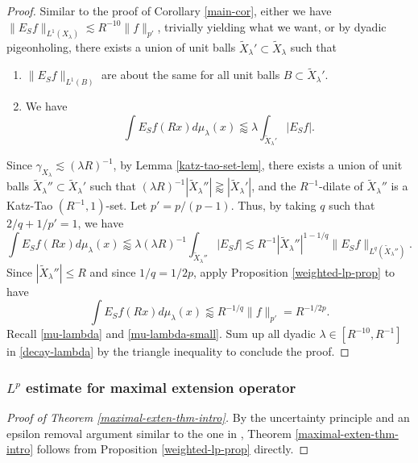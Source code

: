 \documentclass{amsart}
\numberwithin{equation}{section}
\newcommand{\ga}{\gamma}
\newcommand{\la}{\lambda}
\newcommand{\wt}{\widetilde}
\begin{document}
\begin{proof}
Similar to the proof of Corollary \ref{main-cor}, either we have $\|E_Sf\|_{L^1(X_\la)}\lesssim R^{-10}\|f\|_{p'}$, trivially yielding what we want, or by dyadic pigeonholing, there exists a union of unit balls $\wt X_\la'\subset\wt X_\la$ such that 
\begin{enumerate}
    \item $\|E_Sf\|_{L^1(B)}$ are about the same for all unit balls $B\subset \wt X_\la'$.
    \item We have
    \begin{equation}
       \int E_Sf(Rx) d\mu_\la(x)\lessapprox \la \int_{\wt X_\la'} |E_Sf|.
    \end{equation}
\end{enumerate}
Since $\ga_{X_\la}\lesssim (\la R)^{-1}$, by Lemma \ref{katz-tao-set-lem}, there exists a union of unit balls $\wt X_\la''\subset\wt X_\la'$ such that $(\la R)^{-1}|\wt X_\la''|\gtrapprox |\wt X_\la'|$, and the $R^{-1}$-dilate of $\wt X_\la''$ is a Katz-Tao $(R^{-1},1)$-set.
Let $p'=p/(p-1)$.
Thus, by taking $q$ such that $2/q+1/p'=1$, we have
\begin{equation}
    \int E_Sf(Rx) d\mu_\la(x)\lessapprox \la(\la R)^{-1} \int_{\wt X_\la''} |E_Sf|\lesssim R^{-1}|\wt X_\la''|^{1-1/q}\|E_Sf\|_{L^q(\wt X_\la'')}.
\end{equation}
Since $|\wt X_\la''|\leq R$ and since $1/q=1/2p$, apply Proposition \ref{weighted-lp-prop} to have
\begin{equation}
    \int E_Sf(Rx) d\mu_\la(x)\lessapprox R^{-1/q}\|f\|_{p'}= R^{-1/2p}.
\end{equation}
Recall \eqref{mu-lambda} and \eqref{mu-lambda-small}.
Sum up all dyadic $\la\in[R^{-10},R^{-1}]$ in \eqref{decay-lambda} by the triangle inequality to conclude the proof.
\qedhere



\end{proof}


\medskip 

\subsubsection{$L^p$ estimate for maximal extension operator}

\begin{proof}[Proof of Theorem \ref{maximal-exten-thm-intro}]
By the uncertainty principle and an epsilon removal argument similar to the one in \cite[Appendix]{Wu-refined-Strichartz}, Theorem \ref{maximal-exten-thm-intro} follows from Proposition \ref{weighted-lp-prop} directly. 
\end{proof}
\end{document}
